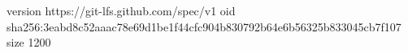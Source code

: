 version https://git-lfs.github.com/spec/v1
oid sha256:3eabd8c52aaac78e69d1be1f44cfc904b830792b64e6b56325b833045cb7f107
size 1200
